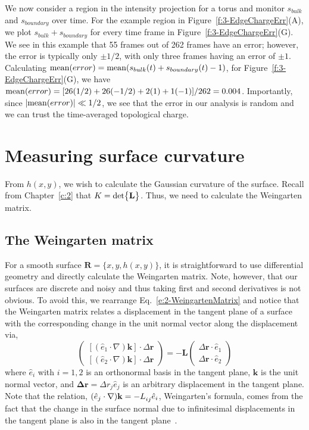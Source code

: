 We now consider a region in the intensity projection for a torus and monitor  $s_{bulk}$ and $s_{boundary}$ over time.
For the example region in Figure~\ref{f:3-EdgeChargeErr}(A), we plot $s_{bulk}+s_{boundary}$ for every time frame in Figure~\ref{f:3-EdgeChargeErr}(G).
We see in this example that 55 frames out of 262 frames have an error; however, the error is typically only $\pm 1/2$, with only three frames having an error of $\pm 1$.
Calculating ${\rm mean}(error) = {\rm mean}(s_{bulk}(t) + s_{boundary}(t) - 1)$, for Figure~\ref{f:3-EdgeChargeErr}(G), we have ${\rm mean}(error) = [26(1/2) + 26(-1/2) + 2(1) + 1(-1)]/262 = 0.004$.
Importantly, since $|{\rm mean}(error)| \ll 1/2$, we see that the error in our analysis is random and we can trust the time-averaged topological charge.




\section{Measuring surface curvature}
From $h(x,y)$, we wish to calculate the Gaussian curvature of the surface.
Recall from Chapter~\ref{c:2} that $K = \textup{det} \big \{ \mathbf{L} \big \}$.
Thus, we need to calculate the Weingarten matrix.


\subsection{The Weingarten matrix}
For a smooth surface $\mathbf{R} = \{x, y, h(x,y)\}$, it is straightforward to use differential geometry and directly calculate the Weingarten matrix.
Note, however, that our surfaces are discrete and noisy and thus taking first and second derivatives is not obvious.
To avoid this, we rearrange Eq.~\ref{e:2-WeingartenMatrix} and notice that the Weingarten matrix relates a displacement in the tangent plane of a surface with the corresponding change in the unit normal vector along the displacement via,
\begin{equation}
  \begin{pmatrix}
  [(\hat{e}_1 \cdot \nabla) \mathbf{k}] \cdot \Delta \mathbf{r} \\
  [(\hat{e}_2 \cdot \nabla) \mathbf{k}] \cdot \Delta \mathbf{r}
  \end{pmatrix}
  =
  -\mathbf{L}
  \begin{pmatrix}
  \Delta \bm{r} \cdot \hat{e}_1 \\
  \Delta \bm{r} \cdot \hat{e}_2
  \end{pmatrix}\label{e:3-Kfit1}
\end{equation}
where $\hat{e}_i$ with $i = 1,2$ is an orthonormal basis in the tangent plane, $\mathbf{k}$ is the unit normal vector, and  $\mathbf{\Delta r} = \Delta r_j \hat{e}_j$ is an arbitrary displacement in the tangent plane.
Note that the relation, $(\hat{e}_j \cdot \nabla) \mathbf{k} = -\tensor{L}{_{ij}} \hat{e}_i$, Weingarten's formula, comes from the fact that the change in the surface normal due to infinitesimal displacements in the tangent plane is also in the tangent plane~\cite{RN35}.

